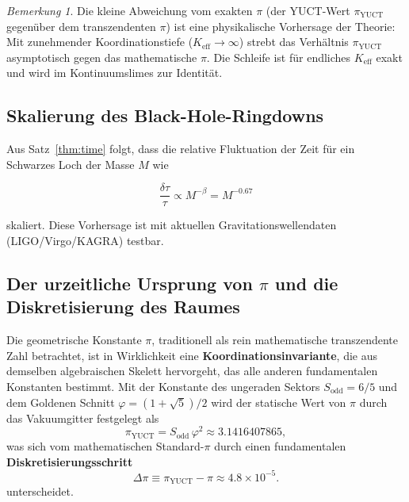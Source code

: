 \documentclass[12pt,a4paper]{article}
\theoremstyle{remark}
\newtheorem{remark}[theorem]{Bemerkung}
\begin{document}
	\begin{remark}
		Die kleine Abweichung vom exakten \(\pi\) (der YUCT-Wert
		\(\pi_{\mathrm{YUCT}}\) gegenüber dem transzendenten \(\pi\)) ist eine
		physikalische Vorhersage der Theorie: Mit zunehmender Koordinationstiefe
		(\(K_{\mathrm{eff}} \to \infty\)) strebt das Verhältnis \(\pi_{\mathrm{YUCT}}\)
		asymptotisch gegen das mathematische \(\pi\). Die Schleife ist für endliches
		\(K_{\mathrm{eff}}\) exakt und wird im Kontinuumslimes zur Identität.
	\end{remark}
	
	\subsection{Skalierung des Black-Hole-Ringdowns}
	
	Aus Satz~\ref{thm:time} folgt, dass die relative Fluktuation der Zeit für ein
	Schwarzes Loch der Masse \(M\) wie
	
	\begin{equation}
		\boxed{\frac{\delta \tau}{\tau} \propto M^{-\beta} = M^{-0.67}}
	\end{equation}
	
	skaliert. Diese Vorhersage ist mit aktuellen Gravitationswellendaten
	(LIGO/Virgo/KAGRA) testbar.
	
	\subsection{Der urzeitliche Ursprung von \(\pi\) und die Diskretisierung des Raumes}
	
	Die geometrische Konstante \(\pi\), traditionell als rein mathematische
	transzendente Zahl betrachtet, ist in Wirklichkeit eine
	\textbf{Koordinationsinvariante}, die aus demselben algebraischen Skelett
	hervorgeht, das alle anderen fundamentalen Konstanten bestimmt. Mit der
	Konstante des ungeraden Sektors \(S_{\mathrm{odd}}=6/5\) und dem Goldenen
	Schnitt \(\varphi = (1+\sqrt{5})/2\) wird der statische Wert von \(\pi\) durch
	das Vakuumgitter festgelegt als
	\[
	\boxed{\pi_{\mathrm{YUCT}} = S_{\mathrm{odd}}\,\varphi^{2}
		\approx 3.1416407865},
	\]
	was sich vom mathematischen Standard-\(\pi\) durch einen fundamentalen
	\textbf{Diskretisierungsschritt}
	\[
	\Delta\pi \equiv \pi_{\mathrm{YUCT}} - \pi \approx 4.8 \times 10^{-5}.
	\]
	unterscheidet.
	
\end{document}
